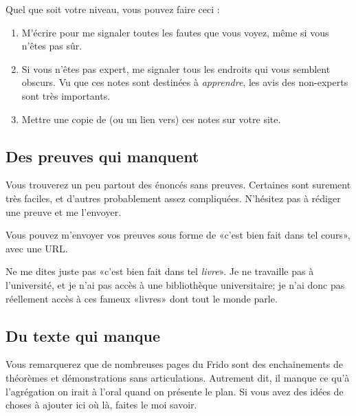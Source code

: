 Quel que soit votre niveau, vous pouvez faire ceci :

\begin{enumerate}
    \item
        M'écrire pour me signaler toutes les fautes que vous voyez, même si vous n'êtes pas sûr.
    \item
        Si vous n'êtes pas expert, me signaler tous les endroits qui vous semblent obscurs. Vu que ces notes sont destinées à \emph{apprendre}, les avis des non-experts sont très importants.
    \item
        Mettre une copie de (ou un lien vers) ces notes sur votre site.
\end{enumerate}

\subsection{Des preuves qui manquent}

Vous trouverez un peu partout des énoncés sans preuves. Certaines sont surement très faciles, et d'autres probablement assez compliquées. N'hésitez pas à rédiger une preuve et me l'envoyer.

Vous pouvez m'envoyer vos preuves sous forme de «c'est bien fait dans tel cours», avec une URL.

Ne me dites juste pas «c'est bien fait dans tel \emph{livre}». Je ne travaille pas à l'université, et je n'ai pas accès à une bibliothèque universitaire; je n'ai donc pas réellement accès à ces fameux «livres» dont tout le monde parle.

\subsection{Du texte qui manque}

Vous remarquerez que de nombreuses pages du Frido sont des enchainements de théorèmes et démonstrations sans articulations. Autrement dit, il manque ce qu'à l'agrégation on irait à l'oral quand on présente le plan. Si vous avez des idées de choses à ajouter ici où là, faites le moi savoir.

